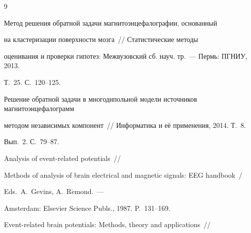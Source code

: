 {\small\frenchspacing


{%




\begin{thebibliography}{9}








\vspace*{-2pt}









Метод решения обратной задачи магнитоэнцефалографии, основанный


на кластеризации поверхности мозга~/\!\!/ Статистические методы


оценивания и проверки гипотез:  Межвузовский сб. науч. тр.~--- Пермь: ПГНИУ, 2013.


 Т.~25. С.~120--125.






Решение обратной задачи в многодипольной модели источников магнитоэнцефалограмм


методом независимых компонент~/\!\!/ Информатика и её применения, 2014. Т.~8.


Вып.~2. С.~79--87.









Analysis of event-related potentials~/\!\!/


Methods of analysis of brain electrical and magnetic signals: EEG handbook~/


Eds.\ A.~Gevins, A.~R$\acute{\mbox{e}}$mond.~---


Amsterdam: Elsevier Science Publs., 1987. P.~131--169.









Event-related brain potentials: Methods, theory and applications~/\!\!/



\end{thebibliography}}}
